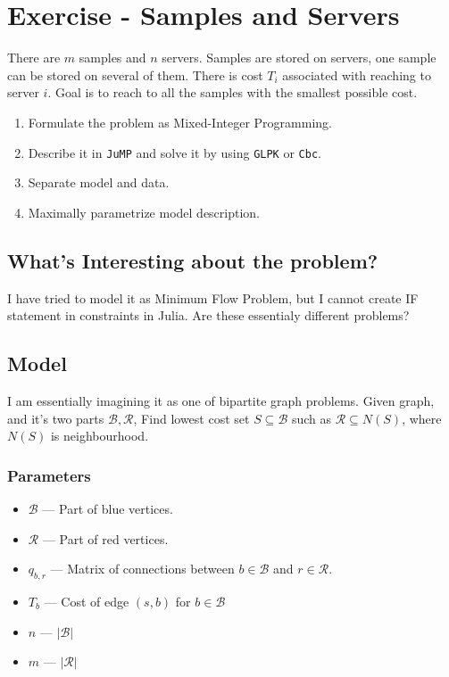 \section{Exercise - Samples and Servers}
There are $m$ samples and $n$ servers.
Samples are stored on servers, one sample can be stored on several of them.
There is cost $T_i$ associated with reaching to server $i$.
Goal is to reach to all the samples with the smallest possible cost.

\begin{enumerate}
    \item Formulate the problem as Mixed-Integer Programming. \done
    \item Describe it in \texttt{JuMP} and solve it by using \texttt{GLPK} or \texttt{Cbc}. \done
    \item Separate model and data. \done
    \item Maximally parametrize model description. \done
\end{enumerate}

\subsection{What's Interesting about the problem?}
I have tried to model it as Minimum Flow Problem, 
but I cannot create IF statement in constraints in Julia.
Are these essentialy different problems?

\subsection{Model}
I am essentially imagining it as one of bipartite graph problems. Given graph, and it's two parts $\mathcal{B}, \mathcal{R}$,
Find lowest cost set $S \subseteq \mathcal{B}$ such as $\mathcal{R} \subseteq N(S)$, where $N(S)$ is neighbourhood.
\subsubsection*{Parameters}
\begin{itemize}
    \item $\mathcal{B}$ --- Part of blue vertices.
    \item $\mathcal{R}$ --- Part of red vertices.
    \item $q_{b,r}$ --- Matrix of connections between $b \in \mathcal{B}$ and $r \in \mathcal{R}$. 
    \item $T_b$ --- Cost of edge $(s, b)$ for $b \in \mathcal{B}$
    \item $n$ --- $|\mathcal{B}|$
    \item $m$ --- $|\mathcal{R}|$
\end{itemize}
